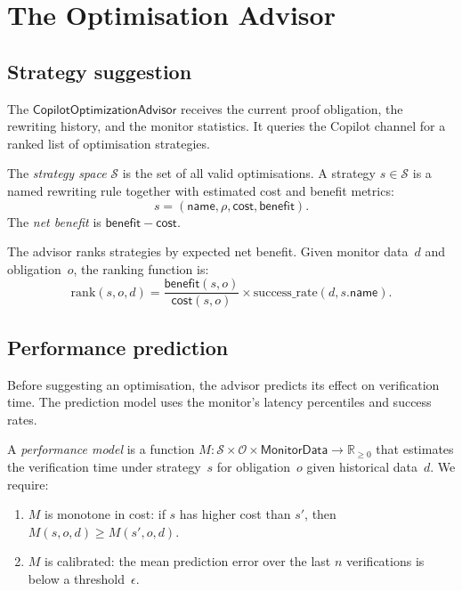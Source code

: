 \documentclass[11pt]{article}
\newcommand{\OptAdv}{\mathsf{CopilotOptimizationAdvisor}}
\begin{document}
\section{The Optimisation Advisor}\label{sec:advisor}

\subsection{Strategy suggestion}

The $\OptAdv$ receives the current proof obligation,
the rewriting history, and the monitor statistics.
It queries the Copilot channel for a ranked list of
optimisation strategies.

\begin{definition}\label{def:stratspace}
The \emph{strategy space} $\mathcal{S}$ is the set of
all valid optimisations.  A strategy $s \in \mathcal{S}$
is a named rewriting rule together with estimated cost
and benefit metrics:
\[
  s = (\mathsf{name}, \rho, \mathsf{cost}, \mathsf{benefit}).
\]
The \emph{net benefit} is $\mathsf{benefit} - \mathsf{cost}$.
\end{definition}

\begin{definition}\label{def:sugrank}
The advisor ranks strategies by expected net benefit.
Given monitor data~$d$ and obligation~$o$, the ranking
function is:
\[
  \mathrm{rank}(s, o, d) =
    \frac{\mathsf{benefit}(s, o)}{\mathsf{cost}(s, o)}
    \times \mathrm{success\_rate}(d, s.\mathsf{name}).
\]
\end{definition}

\subsection{Performance prediction}

Before suggesting an optimisation, the advisor predicts
its effect on verification time.  The prediction model
uses the monitor's latency percentiles and success rates.

\begin{definition}\label{def:perfmodel}
A \emph{performance model} is a function
$M \colon \mathcal{S} \times \mathcal{O} \times
\mathsf{MonitorData} \to \mathbb{R}_{\geq 0}$
that estimates the verification time under strategy~$s$
for obligation~$o$ given historical data~$d$.  We require:
\begin{enumerate}
\item $M$ is monotone in cost: if $s$ has higher cost
      than $s'$, then $M(s, o, d) \geq M(s', o, d)$.
\item $M$ is calibrated: the mean prediction error
      over the last $n$ verifications is below a
      threshold~$\epsilon$.
\end{enumerate}
\end{definition}
\end{document}
